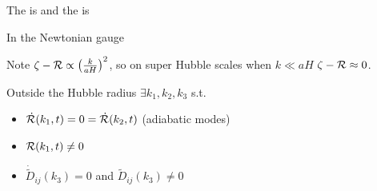 \documentclass{article}
\begin{document}
\begin{definition}
The  is 
and the  is 
\end{definition}

\begin{prop}
In the Newtonian gauge 
\end{prop}

Note $\zeta-\mathcal{R} \propto \left(\frac{k}{aH}\right)^2$, so on super Hubble scales when $k\ll aH$ $\zeta-\mathcal{R} \approx0$.

\begin{theorem}
Outside the Hubble radius $\exists k_1, k_2, k_3$ s.t. 
\begin{itemize}
    \item $\dot{\mathcal{R}}(k_1,t) = 0 = \dot{\mathcal{R}}(k_2,t)$ (adiabatic modes) 
    \item $\mathcal{R}(k_1,t) \neq 0$
    \item $\dot{\tilde{D}}_{ij}(k_3) = 0$ and $\tilde{D}_{ij}(k_3) \neq 0$
\end{itemize}
\end{theorem}
\end{document}
